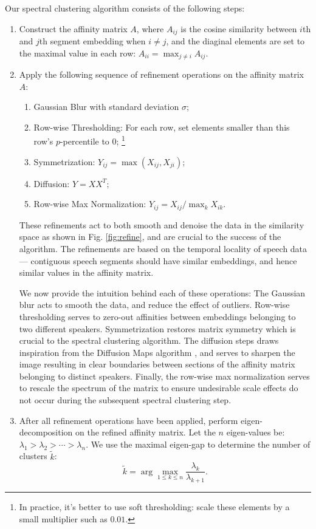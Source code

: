 \documentclass{article}
\begin{document}
Our spectral clustering algorithm consists of the following steps:
\begin{enumerate}
\item Construct the affinity matrix $A$, where $A_{ij}$ is the
cosine similarity between $i$th and $j$th segment embedding when $i \neq j$, and the diaginal
elements are set to the maximal value in each row: $A_{ii}=\max_{j \neq i} A_{ij}$.

\item Apply the following sequence of refinement operations on the affinity matrix $A$:
\begin{enumerate}
  \item Gaussian Blur with standard deviation $\sigma$;
  \item Row-wise Thresholding: For each row, set elements smaller than this row's
  $p$-percentile to 0;
  \footnote{In practice, it's better to use soft thresholding: scale these elements by a small multiplier such as $0.01$.}
  \item Symmetrization: $Y_{ij}=\max(X_{ij},X_{ji})$;
  \item Diffusion: $Y=XX^T$;
  \item Row-wise Max Normalization:
  $Y_{ij}=X_{ij}/\max_{k}X_{ik}$.
\end{enumerate}
These refinements act to both smooth and denoise the data in the similarity space as shown in Fig. \ref{fig:refine}, and are crucial to the success of the algorithm. The refinements are based on the temporal locality of speech data --- contiguous speech segments should have similar embeddings, and hence similar values in the affinity matrix.

We now provide the intuition behind each of these operations: The Gaussian blur acts to smooth the data, and reduce the effect of outliers. Row-wise thresholding serves to zero-out affinities between embeddings belonging to two different speakers. Symmetrization restores matrix symmetry which is crucial to the spectral clustering algorithm. The diffusion steps draws inspiration from the Diffusion Maps algorithm \cite{coifman2006diffusion}, and serves to sharpen the image resulting in clear boundaries between sections of the affinity matrix belonging to distinct speakers. Finally, the row-wise max normalization serves to rescale the spectrum of the matrix to ensure undesirable scale effects do not occur during the subsequent spectral clustering step.

\item After all refinement operations have been applied,
perform eigen-decomposition on the refined affinity matrix.
Let the $n$ eigen-values be:
$\lambda_1 > \lambda_2 > \cdots > \lambda_n$.
We use the maximal eigen-gap to determine the number of clusters $\widetilde{k}$:
\begin{equation}
\widetilde{k}=\arg\max_{1 \leq k \leq n} \frac{\lambda_k}{\lambda_{k+1}} .
\end{equation}


\end{enumerate}
\end{document}
